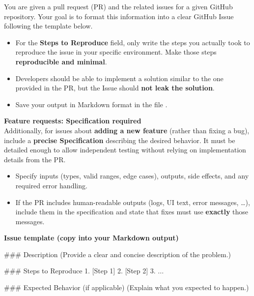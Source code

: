 \begin{promptbox}
\medskip
{}
\end{promptbox}


\begin{promptbox}
You are given a pull request (PR) and the related issues for a given GitHub repository.
Your goal is to format this information into a clear GitHub Issue following the template below.

\begin{itemize}[leftmargin=1.6em, itemsep=0.25em]
  \item For the \textbf{Steps to Reproduce} field, only write the steps you actually took to reproduce the issue in your specific environment. Make those steps \textbf{reproducible and minimal}.
  \item Developers should be able to implement a solution similar to the one provided in the PR, but the Issue should \textbf{not leak the solution}.
  \item Save your output in Markdown format in the file .
\end{itemize}

\medskip
\textbf{Feature requests: Specification required}\\
Additionally, for issues about \textbf{adding a new feature} (rather than fixing a bug), include a \textbf{precise Specification} describing the desired behavior. It must be detailed enough to allow independent testing without relying on implementation details from the PR.

\begin{itemize}[leftmargin=1.6em, itemsep=0.25em]
  \item Specify inputs (types, valid ranges, edge cases), outputs, side effects, and any required error handling.
  \item If the PR includes human-readable outputs (logs, UI text, error messages, \dots), include them in the specification and state that fixes must use \textbf{exactly} those messages.
\end{itemize}

\medskip
\textbf{Issue template (copy into your Markdown output)}
\begin{schemabox}
### Description
(Provide a clear and concise description of the problem.)

### Steps to Reproduce
1. [Step 1]
2. [Step 2]
3. ...

### Expected Behavior (if applicable)
(Explain what you expected to happen.)


\end{schemabox}
\end{promptbox}
